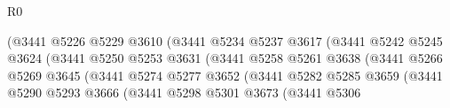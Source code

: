 \begin{lexlean}{R0}
\begin{coremodule}
                                              (@3441
                                                @5226
                                                @5229
                                                @3610
                                                (@3441
                                                  @5234
                                                  @5237
                                                  @3617
                                                  (@3441
                                                    @5242
                                                    @5245
                                                    @3624
                                                    (@3441
                                                      @5250
                                                      @5253
                                                      @3631
                                                      (@3441
                                                        @5258
                                                        @5261
                                                        @3638
                                                        (@3441
                                                          @5266
                                                          @5269
                                                          @3645
                                                          (@3441
                                                            @5274
                                                            @5277
                                                            @3652
                                                            (@3441
                                                              @5282
                                                              @5285
                                                              @3659
                                                              (@3441
                                                                @5290
                                                                @5293
                                                                @3666
                                                                (@3441
                                                                  @5298
                                                                  @5301
                                                                  @3673
                                                                  (@3441
                                                                    @5306

\end{coremodule}
\end{lexlean}
